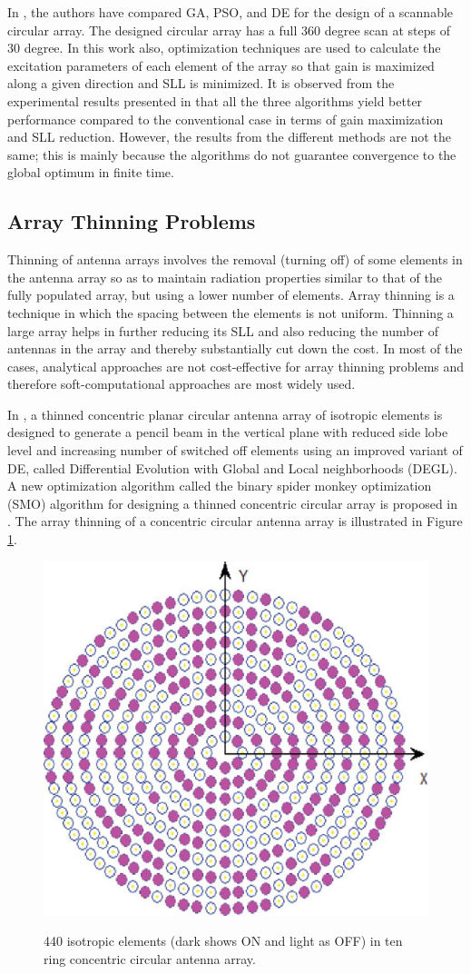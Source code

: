 In \cite{compCAD4Arry}, the authors have compared GA, PSO, and DE for the design of a scannable circular array. The designed circular array has a full 360 degree scan at steps of 30 degree. In this work also, optimization techniques are used to calculate the excitation parameters of each element of the array so that gain is maximized along a given direction and SLL is minimized. It is observed from the experimental results presented in \cite{compCAD4Arry} that all the three algorithms yield better performance compared to the conventional case in terms of gain maximization and SLL reduction. However, the results from the different methods are not the same; this is mainly because the algorithms do not guarantee convergence to the global optimum in finite time.

\subsection{Array Thinning Problems}
Thinning of antenna arrays involves the removal (turning off) of some elements in the antenna array so as to maintain radiation properties similar to that of the fully populated array, but using a lower number of elements. Array thinning is a technique in which the spacing between the elements is not uniform. Thinning a large array helps in further reducing its SLL and also reducing the number of antennas in the array and thereby substantially cut down the cost. In most of the cases, analytical approaches are not cost-effective for array thinning problems and therefore soft-computational approaches are most widely used.

In \cite{arrayThin1}, a thinned concentric planar circular antenna array of isotropic elements is designed to generate a pencil beam in the vertical plane with reduced side lobe level and increasing number of switched off elements using an improved variant of DE, called Differential Evolution with Global and Local neighborhoods (DEGL). A new optimization algorithm called the binary spider monkey optimization (SMO) algorithm for designing a thinned concentric circular array is proposed in \cite{arrayThin2}. The array thinning of a concentric circular antenna array is illustrated in Figure \ref{fig_2_4}.

\begin{figure}
  \centering
  \includegraphics[width=0.35\linewidth]{fig_2_4.eps}\\
  \caption [Isotropic elements (dark shows ON and light as OFF) in ten ring concentric circular antenna array]{440 isotropic elements (dark shows ON and light as OFF) in ten ring concentric circular antenna array. \cite{arrayThin2}} \label{fig_2_4}
\end{figure}

